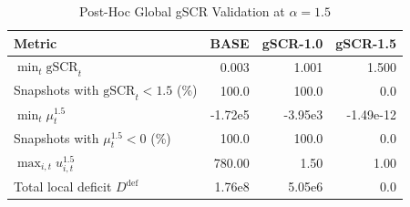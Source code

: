 \begin{table}[!t]
\centering
\caption{Post-Hoc Global gSCR Validation at \(\alpha=1.5\)}
\label{tab:strength_validation}
\renewcommand{\arraystretch}{1.08}
\begin{tabular}{lrrr}
\toprule
Metric & BASE & gSCR-1.0 & gSCR-1.5 \\
\midrule
\(\min_t \mathrm{gSCR}_t\)                  & 0.003 & 1.001 & 1.500 \\
Snapshots with \(\mathrm{gSCR}_t<1.5\) (\%) & 100.0 & 100.0 & 0.0 \\
\(\min_t \mu_t^{1.5}\)                      & -1.72e5 & -3.95e3 & -1.49e-12 \\
Snapshots with \(\mu_t^{1.5}<0\) (\%)       & 100.0 & 100.0 & 0.0 \\
\(\max_{i,t} u_{i,t}^{1.5}\)                & 780.00 & 1.50 & 1.00 \\
Total local deficit \(D^{\mathrm{def}}\)    & 1.76e8 & 5.05e6 & 0.0 \\
\bottomrule
\end{tabular}
\end{table}
